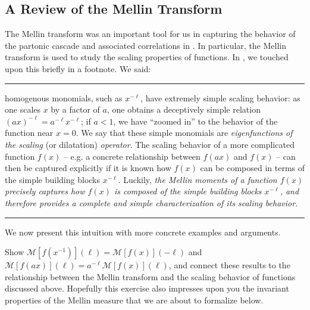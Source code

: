 \begin{subappendices}
\section{A Review of the Mellin Transform}

The Mellin transform was an important tool for us in capturing the behavior of the partonic cascade and associated correlations in .
%
In particular, the Mellin transform is used to study the scaling properties of functions.
%
In , we touched upon this briefly in a footnote.
%
We said:

\vspace{7pt}
\hrule
\vspace{7pt}

homogenous monomials, such as \(x^{-\ell}\), have extremely simple scaling behavior:
%
as one scales \(x\) by a factor of \(a\), one obtains a deceptively simple relation \((a x)^{-\ell} = a^{-\ell} x^{-\ell}\);
%
if \(a < 1\), we have ``zoomed in'' to the behavior of the function near \(x = 0\).
%
We say that these simple monomials are \textit{eigenfunctions of the scaling} (or dilatation) \textit{operator}.
%
The scaling behavior of a more complicated function \(f(x)\) -- e.g. a concrete relationship between \(f(ax)\) and \(f(x)\) -- can then be captured explicitly if it is known how \(f(x)\) can be composed in terms of the simple building blocks \(x^{-\ell}\).
%
Luckily, \textit{the Mellin moments of a function \(f(x)\) precisely captures how \(f(x)\) is composed of the simple building blocks \(x^{-\ell}\), and therefore provides a complete and simple characterization of its scaling behavior.}

\vspace{7pt}
\hrule
\vspace{7pt}


We now present this intuition with more concrete examples and arguments.

\begin{exercise}
    Show \(\mathcal{M}[f(x^{-1})](\ell) = \mathcal{M}[f(x)](-\ell)\) and \(\mathcal{M}[f(a x)](\ell) = a^{-\ell} \mathcal{M}[f(x)](\ell)\), and connect these results to the relationship between the Mellin transform and the scaling behavior of functions discussed above.
    Hopefully this exercise also impresses upon you the invariant properties of the Mellin measure that we are about to formalize below.
\end{exercise}



\end{subappendices}
